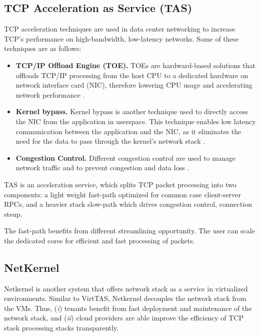 \subsection{TCP Acceleration as Service (TAS)}
TCP acceleration techniques are used in data center networking to increase TCP's performance
on high-bandwidth, low-latency networks. Some of these techniques are as follows:
\begin{itemize}
    \item \textbf{TCP/IP Offload Engine (TOE).} TOEs are hardward-based solutions that offloads
    TCP/IP processing from the host CPU to a dedicated hardware on network interface card 
    (NIC), therefore lowering CPU usage and accelerating network performance
    \cite{shashidhara2022flextoe,wu2006design,kant2003tcp,freimuth2005server}.
    \item \textbf{Kernel bypass.} Kernel bypass is another technique used to directly access 
    the NIC from the application in userspace. This technique enables low latency 
    communication between the application and the NIC, as it eliminates the need for 
    the data to pass through the kernel's network stack 
    \cite{chen2018survey, kaufmann2019tas, marty2019snap}. 
    \item \textbf{Congestion Control.} Different congestion control are used to manage
    network traffic and to prevent congestion and data loss \cite{mittal2015timely,kumar2020swift}. 
\end{itemize}

TAS is an acceleration service, which splits TCP packet processing 
into two components: a light weight fast-path optimized for common case client-server RPCs,
and a heavier stack slow-path which drives congestion control, connection steup. 

The fast-path benefits from different streamlining opportunity. The user can scale the 
dedicated cores for efficient and fast processing of packets.




\subsection{NetKernel}
Netkernel is another system that offers network stack as a service in virtualized 
environments. Similar to VirtTAS, Netkernel decouples the network stack from the VMs. Thus, 
(\emph{i}) tenants benefit from fast deployment and maintenance of the network 
stack, and (\emph{ii}) cloud providers are able improve the efficiency of TCP stack processing stacks 
transparently. 

